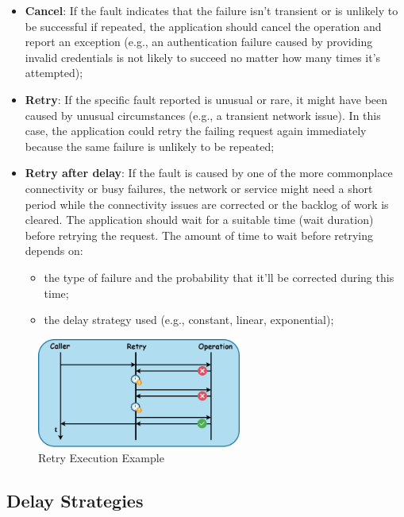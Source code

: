 \begin{itemize}
    \item \textbf{Cancel}: If the fault indicates that the failure isn't transient or is unlikely to be successful if repeated, the application should cancel the operation and report an exception (e.g., an authentication failure caused by providing invalid credentials is not likely to succeed no matter how many times it's attempted);
    \item \textbf{Retry}: If the specific fault reported is unusual or rare, it might have been caused by unusual circumstances (e.g., a transient network issue).
    In this case, the application could retry the failing request again immediately because the same failure is unlikely to be repeated;
    \item \textbf{Retry after delay}: If the fault is caused by one of the more commonplace connectivity or busy failures, the network or service might need a short period while the connectivity issues are corrected or the backlog of work is cleared.
    The application should wait for a suitable time (wait duration) before retrying the request.
    The amount of time to wait before retrying depends on:
    \begin{itemize}
        \item the type of failure and the probability that it'll be corrected during this time;
        \item the delay strategy used (e.g., constant, linear, exponential);
    \end{itemize}
\end{itemize}

\begin{figure}[!htb]
    \centering
    \includegraphics[width=0.6\textwidth]{../figures/04_retry-execution-example}
    \caption{Retry Execution Example}
    \label{fig:retry-execution-example}
\end{figure}

\subsection{Delay Strategies}\label{subsec:retry-delay-strategies}

